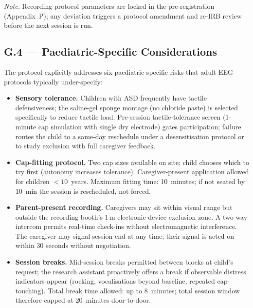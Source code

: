 \vspace{0.3em}\noindent\textit{Note.} Recording protocol parameters are locked in the pre-registration (Appendix~P); any deviation triggers a protocol amendment and re-IRB review before the next session is run.

\subsection*{G.4 --- Paediatric-Specific Considerations}
\label{subsec:appg_paediatric_considerations}

The protocol explicitly addresses six paediatric-specific risks that adult EEG protocols typically under-specify:

\begin{itemize}[leftmargin=*, itemsep=4pt]
    \item \textbf{Sensory tolerance.} Children with ASD frequently have tactile defensiveness; the saline-gel sponge montage (no chloride paste) is selected specifically to reduce tactile load. Pre-session tactile-tolerance screen (1-minute cap simulation with single dry electrode) gates participation; failure routes the child to a same-day reschedule under a desensitisation protocol or to study exclusion with full caregiver feedback.

    \item \textbf{Cap-fitting protocol.} Two cap sizes available on site; child chooses which to try first (autonomy increases tolerance). Caregiver-present application allowed for children $<10$~years. Maximum fitting time: 10~minutes; if not seated by 10~min the session is rescheduled, not forced.

    \item \textbf{Parent-present recording.} Caregivers may sit within visual range but outside the recording booth's 1\,m electronic-device exclusion zone. A two-way intercom permits real-time check-ins without electromagnetic interference. The caregiver may signal session-end at any time; their signal is acted on within 30 seconds without negotiation.

    \item \textbf{Session breaks.} Mid-session breaks permitted between blocks at child's request; the research assistant proactively offers a break if observable distress indicators appear (rocking, vocalisations beyond baseline, repeated cap-touching). Total break time allowed: up to 8~minutes; total session window therefore capped at 20~minutes door-to-door.


\end{itemize}
